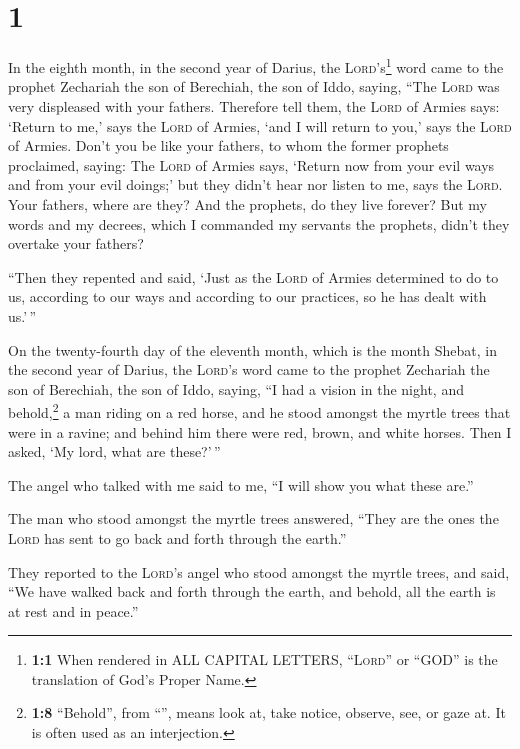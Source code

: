 \hypertarget{section}{%
\section{1}\label{section}}

 In the eighth month, in the second year of Darius, the
\textsc{Lord}'s\footnote{\textbf{1:1} When rendered in ALL CAPITAL
  LETTERS, ``\textsc{Lord}'' or ``GOD'' is the translation of God's
  Proper Name.} word came to the prophet Zechariah the son of Berechiah,
the son of Iddo, saying,  ``The \textsc{Lord} was very
displeased with your fathers.  Therefore tell them, the
\textsc{Lord} of Armies says: `Return to me,' says the \textsc{Lord} of
Armies, `and I will return to you,' says the \textsc{Lord} of Armies.
 Don't you be like your fathers, to whom the former
prophets proclaimed, saying: The \textsc{Lord} of Armies says, `Return
now from your evil ways and from your evil doings;' but they didn't hear
nor listen to me, says the \textsc{Lord}.  Your fathers,
where are they? And the prophets, do they live forever? 
But my words and my decrees, which I commanded my servants the prophets,
didn't they overtake your fathers?

``Then they repented and said, `Just as the \textsc{Lord} of Armies
determined to do to us, according to our ways and according to our
practices, so he has dealt with us.'\,''

 On the twenty-fourth day of the eleventh month, which is
the month Shebat, in the second year of Darius, the \textsc{Lord}'s word
came to the prophet Zechariah the son of Berechiah, the son of Iddo,
saying,  ``I had a vision in the night, and
behold,\footnote{\textbf{1:8} ``Behold'', from ``'', means
  look at, take notice, observe, see, or gaze at. It is often used as an
  interjection.} a man riding on a red horse, and he stood amongst the
myrtle trees that were in a ravine; and behind him there were red,
brown, and white horses.  Then I asked, `My lord, what are
these?'\,''

The angel who talked with me said to me, ``I will show you what these
are.''

 The man who stood amongst the myrtle trees answered,
``They are the ones the \textsc{Lord} has sent to go back and forth
through the earth.''

 They reported to the \textsc{Lord}'s angel who stood
amongst the myrtle trees, and said, ``We have walked back and forth
through the earth, and behold, all the earth is at rest and in peace.''

